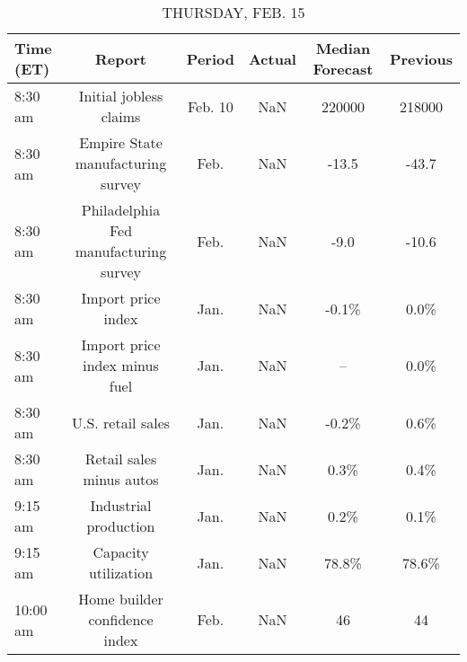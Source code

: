 \documentclass{article}%
\begin{document}
%


\begin{table}[htbp]%
\caption{THURSDAY, FEB. 15}%
\centering%
\begin{adjustbox}{width=1\textwidth}%
\begin{tabular}{lccccc}
\toprule
Time (ET) &                                Report &  Period & Actual & Median Forecast & Previous \\
\midrule
  8:30 am &                Initial jobless claims & Feb. 10 &    NaN &          220000 &   218000 \\
  8:30 am &     Empire State manufacturing survey &    Feb. &    NaN &           -13.5 &    -43.7 \\
  8:30 am & Philadelphia Fed manufacturing survey &    Feb. &    NaN &            -9.0 &    -10.6 \\
  8:30 am &                    Import price index &    Jan. &    NaN &           -0.1\% &     0.0\% \\
  8:30 am &         Import price index minus fuel &    Jan. &    NaN &              -- &     0.0\% \\
  8:30 am &                     U.S. retail sales &    Jan. &    NaN &           -0.2\% &     0.6\% \\
  8:30 am &              Retail sales minus autos &    Jan. &    NaN &            0.3\% &     0.4\% \\
  9:15 am &                 Industrial production &    Jan. &    NaN &            0.2\% &     0.1\% \\
  9:15 am &                  Capacity utilization &    Jan. &    NaN &           78.8\% &    78.6\% \\
 10:00 am &         Home builder confidence index &    Feb. &    NaN &              46 &       44 \\
\bottomrule
\end{tabular}
%
\end{adjustbox}%
\end{table}

%
\end{document}
